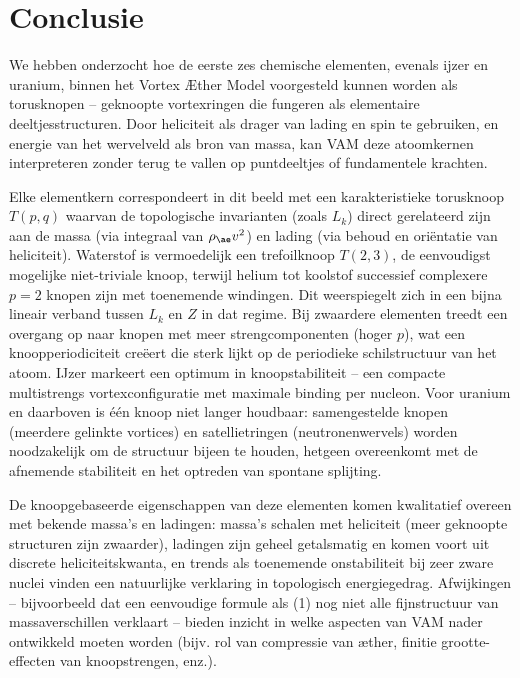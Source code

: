 \section{Conclusie}

We hebben onderzocht hoe de eerste zes chemische elementen, evenals ijzer en uranium, binnen het Vortex Æther Model voorgesteld kunnen worden als torusknopen – geknoopte vortexringen die fungeren als elementaire deeltjesstructuren. Door heliciteit als drager van lading en spin te gebruiken, en energie van het wervelveld als bron van massa, kan VAM deze atoomkernen interpreteren zonder terug te vallen op puntdeeltjes of fundamentele krachten.

Elke elementkern correspondeert in dit beeld met een karakteristieke torusknoop $T(p,q)$ waarvan de topologische invarianten (zoals $L_k$) direct gerelateerd zijn aan de massa (via integraal van $\rho_{\ae} v^2$) en lading (via behoud en oriëntatie van heliciteit). Waterstof is vermoedelijk een trefoilknoop $T(2,3)$, de eenvoudigst mogelijke niet-triviale knoop, terwijl helium tot koolstof successief complexere $p=2$ knopen zijn met toenemende windingen. Dit weerspiegelt zich in een bijna lineair verband tussen $L_k$ en $Z$ in dat regime. Bij zwaardere elementen treedt een overgang op naar knopen met meer strengcomponenten (hoger $p$), wat een knoopperiodiciteit creëert die sterk lijkt op de periodieke schilstructuur van het atoom. IJzer markeert een optimum in knoopstabiliteit – een compacte multistrengs vortexconfiguratie met maximale binding per nucleon. Voor uranium en daarboven is één knoop niet langer houdbaar: samengestelde knopen (meerdere gelinkte vortices) en satellietringen (neutronenwervels) worden noodzakelijk om de structuur bijeen te houden, hetgeen overeenkomt met de afnemende stabiliteit en het optreden van spontane splijting.

De knoopgebaseerde eigenschappen van deze elementen komen kwalitatief overeen met bekende massa’s en ladingen: massa’s schalen met heliciteit (meer geknoopte structuren zijn zwaarder), ladingen zijn geheel getalsmatig en komen voort uit discrete heliciteitskwanta, en trends als toenemende onstabiliteit bij zeer zware nuclei vinden een natuurlijke verklaring in topologisch energiegedrag. Afwijkingen – bijvoorbeeld dat een eenvoudige formule als (1) nog niet alle fijnstructuur van massaverschillen verklaart – bieden inzicht in welke aspecten van VAM nader ontwikkeld moeten worden (bijv. rol van compressie van æther, finitie grootte-effecten van knoopstrengen, enz.).

